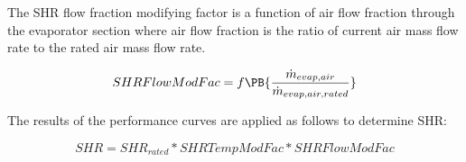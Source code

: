 The SHR flow fraction modifying factor is a function of air flow fraction through the evaporator section where air flow fraction is the ratio of current air mass flow rate to the rated air mass flow rate.

\begin{equation}
SHRFlowModFac = f\PB{\frac{\dot{m}_{evap,air}}{\dot{m}_{evap,air,rated}}}
\end{equation}

The results of the performance curves are applied as follows to determine SHR:

\begin{equation}
SHR = SH{R_{rated}}*SHRTempModFac*SHRFlowModFac
\end{equation}
